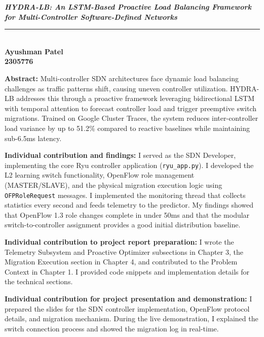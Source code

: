 \documentclass[12pt,a4paper]{report}
\newcommand{\ProjectTitle}{HYDRA-LB: An LSTM-Based Proactive Load Balancing Framework for Multi-Controller Software-Defined Networks}
\begin{document}
\newpage
\thispagestyle{fancy}
\begin{center}
{\large \textbf{\textit{\ProjectTitle}}}\\
\rule{\textwidth}{0.4pt}\\[1cm]

{\Large \textbf{ Ayushman Patel}}\\
{\large \textbf{2305776}}\\[0.8cm]
\end{center}

\noindent\textbf{Abstract:} Multi-controller SDN architectures face dynamic load balancing challenges as traffic patterns shift, causing uneven controller utilization. HYDRA-LB addresses this through a proactive framework leveraging bidirectional LSTM with temporal attention to forecast controller load and trigger preemptive switch migrations. Trained on Google Cluster Traces, the system reduces inter-controller load variance by up to 51.2\% compared to reactive baselines while maintaining sub-6.5ms latency.

\vspace{0.5cm}
\noindent\textbf{Individual contribution and findings:} I served as the SDN Developer, implementing the core Ryu controller application (\texttt{ryu\_app.py}). I developed the L2 learning switch functionality, OpenFlow role management (MASTER/SLAVE), and the physical migration execution logic using \texttt{OFPRoleRequest} messages. I implemented the monitoring thread that collects statistics every second and feeds telemetry to the predictor. My findings showed that OpenFlow 1.3 role changes complete in under 50ms and that the modular switch-to-controller assignment provides a good initial distribution baseline.

\vspace{0.5cm}
\noindent\textbf{Individual contribution to project report preparation:} I wrote the Telemetry Subsystem and Proactive Optimizer subsections in Chapter 3, the Migration Execution section in Chapter 4, and contributed to the Problem Context in Chapter 1. I provided code snippets and implementation details for the technical sections.

\vspace{0.5cm}
\noindent\textbf{Individual contribution for project presentation and demonstration:} I prepared the slides for the SDN controller implementation, OpenFlow protocol details, and migration mechanism. During the live demonstration, I explained the switch connection process and showed the migration log in real-time.
\end{document}
